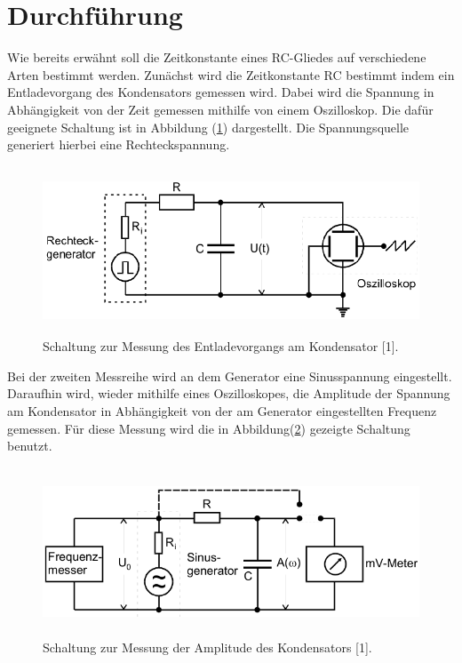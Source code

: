 \section{Durchführung}

Wie bereits erwähnt soll die Zeitkonstante eines RC-Gliedes auf verschiedene Arten bestimmt werden.
Zunächst wird die Zeitkonstante RC bestimmt indem ein Entladevorgang des Kondensators gemessen
wird. Dabei wird die Spannung in Abhängigkeit von der Zeit gemessen mithilfe von einem
Oszilloskop. Die dafür geeignete Schaltung ist in Abbildung (\ref{fig:2}) dargestellt. Die Spannungsquelle
generiert hierbei eine Rechteckspannung.

\begin{figure}[H]
  \centering
  \includegraphics[height=5cm, width=\textwidth]{D1.png}
  \caption{Schaltung zur Messung des Entladevorgangs am Kondensator [1].}
  \label{fig:2}
\end{figure}

Bei der zweiten Messreihe wird an dem Generator eine Sinusspannung eingestellt.
Daraufhin wird, wieder mithilfe eines Oszilloskopes, die Amplitude der Spannung am
Kondensator in Abhängigkeit von der am Generator eingestellten Frequenz gemessen.
Für diese Messung wird die in Abbildung(\ref{fig:3}) gezeigte Schaltung benutzt.

\begin{figure}[H]
  \centering
  \includegraphics[height=5cm, width=\textwidth]{D2.png}
  \caption{Schaltung zur Messung der Amplitude des Kondensators [1].}
  \label{fig:3}
\end{figure}

